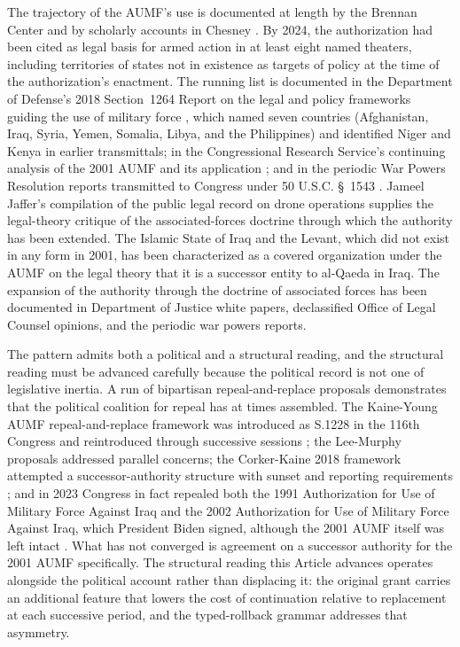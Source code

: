 The trajectory of the AUMF's use is documented at length by the Brennan Center
\cite{ref_brennan_center_aumf} and by scholarly accounts in Chesney \cite{ref_chesney_aumf}.
By 2024, the authorization had been cited as legal basis for armed action in at least eight named
theaters, including territories of states not in existence as targets of policy at the time of the
authorization's enactment.
The running list is documented in the Department of Defense's 2018 Section~1264 Report on the legal and
policy frameworks guiding the use of military force \cite{ref_dod_1264_report_2018}, which named seven
countries (Afghanistan, Iraq, Syria, Yemen, Somalia, Libya, and the Philippines) and identified Niger
and Kenya in earlier transmittals; in the Congressional Research Service's continuing analysis of the
2001 AUMF and its application \cite{ref_crs_r43983_aumf}; and in the periodic War Powers Resolution
reports transmitted to Congress under 50 U.S.C. \S~1543
\cite{ref_war_powers_reports_2021_2023}.
Jameel Jaffer's compilation of the public legal record on drone operations
\cite{ref_jaffer_aumf} supplies the legal-theory critique of the associated-forces doctrine through
which the authority has been extended.
The Islamic State of Iraq and the Levant, which did not exist in any form in 2001, has been
characterized as a covered organization under the AUMF on the legal theory that it is a successor
entity to al-Qaeda in Iraq.
The expansion of the authority through the doctrine of associated forces has been documented in
Department of Justice white papers, declassified Office of Legal Counsel opinions, and the periodic war
powers reports.

The pattern admits both a political and a structural reading, and the structural reading must be
advanced carefully because the political record is not one of legislative inertia.
A run of bipartisan repeal-and-replace proposals demonstrates that the political coalition for repeal
has at times assembled.
The Kaine-Young AUMF repeal-and-replace framework was introduced as S.1228 in the 116th Congress and
reintroduced through successive sessions \cite{ref_kaine_young_aumf}; the Lee-Murphy proposals
addressed parallel concerns; the Corker-Kaine 2018 framework attempted a successor-authority structure
with sunset and reporting requirements \cite{ref_corker_kaine_2018}; and in 2023 Congress in fact
repealed both the 1991 Authorization for Use of Military Force Against Iraq and the 2002 Authorization
for Use of Military Force Against Iraq, which President Biden signed, although the 2001 AUMF itself was
left intact \cite{ref_iraq_aumf_repeal_2023}.
What has not converged is agreement on a successor authority for the 2001 AUMF specifically.
The structural reading this Article advances operates alongside the political account rather than
displacing it: the original grant carries an additional feature that lowers the cost of continuation
relative to replacement at each successive period, and the typed-rollback grammar addresses that
asymmetry.

